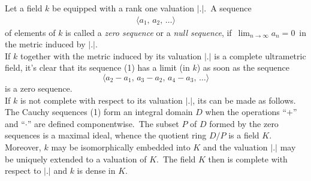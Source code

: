 \documentclass[12pt]{article}
\theoremstyle{definition}
\begin{document}
Let a field $k$ be equipped with a rank one valuation $|.|$.\, A sequence 
\begin{align}
\langle a_1,\,a_2,\,\ldots \rangle
\end{align}
of elements of $k$ is called a \emph{zero sequence} or a \emph{null sequence}, if\, $\displaystyle\lim_{n\to\infty}a_n = 0$\,
in the metric induced by $|.|$.\\

If $k$ together with the metric induced by its valuation $|.|$ is a 
complete ultrametric field, it's clear that its sequence
(1) has a limit (in $k$) as soon as the sequence
$$\langle a_2\!-a_1,\, a_3\!-\!a_2,\,a_4\!-\!a_3,\,\ldots \rangle$$
is a zero sequence.\\

If $k$ is not complete with respect to its valuation $|.|$, its 
 can be made as follows.\, The 
Cauchy sequences (1) form an integral domain $D$ when the 
operations ``$+$'' and ``$\cdot$'' are defined componentwise.\, The 
subset $P$ of $D$ formed by the zero sequences is a 
maximal ideal, whence the quotient ring $D/P$ is a field 
$K$.\, Moreover, $k$ may be isomorphically embedded into $K$ and 
the valuation $|.|$ may be uniquely extended to a valuation of 
$K$.\, The field $K$ then is complete with respect to $|.|$ and $k$ 
is dense in $K$.

\end{document}
